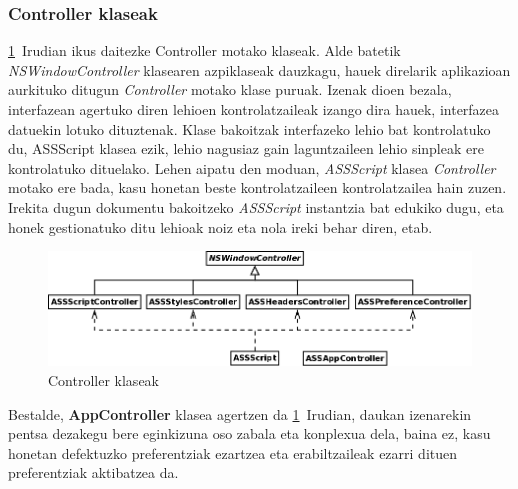\subsubsection{Controller klaseak}
\ref{kd-controller}~Irudian ikus daitezke Controller motako klaseak. Alde batetik \textit{NSWindowController} klasearen azpiklaseak dauzkagu, hauek direlarik aplikazioan aurkituko ditugun \textit{Controller} motako klase puruak. Izenak dioen bezala, interfazean agertuko diren lehioen kontrolatzaileak izango dira hauek, interfazea datuekin lotuko dituztenak. Klase bakoitzak interfazeko lehio bat kontrolatuko du, ASSScript klasea ezik, lehio nagusiaz gain laguntzaileen lehio sinpleak ere kontrolatuko dituelako. Lehen aipatu den moduan, \textit{ASSScript} klasea \textit{Controller} motako ere bada, kasu honetan beste kontrolatzaileen kontrolatzailea hain zuzen. Irekita dugun dokumentu bakoitzeko \textit{ASSScript} instantzia bat edukiko dugu, eta honek gestionatuko ditu lehioak noiz eta nola ireki behar diren, etab.
\begin{figure}[htp]
\begin{center}
\includegraphics[scale=0.3]{Pictures/Chapter4/Diseinua/KD-Controller.png}
\caption{Controller klaseak}
\label{kd-controller}
\end{center}
\end{figure}
Bestalde, \textbf{AppController} klasea agertzen da \ref{kd-controller}~Irudian, daukan izenarekin pentsa dezakegu bere eginkizuna oso zabala eta konplexua dela, baina ez, kasu honetan defektuzko preferentziak ezartzea eta erabiltzaileak ezarri dituen preferentziak aktibatzea da.

